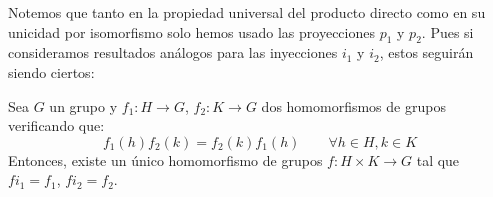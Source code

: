 \noindent
Notemos que tanto en la propiedad universal del producto directo como en su unicidad por isomorfismo solo hemos usado las proyecciones $p_1$ y $p_2$. Pues si consideramos resultados análogos para las inyecciones $i_1$ y $i_2$, estos seguirán siendo ciertos:

\begin{teo}
    Sea $G$ un grupo y $f_1:H\to G$, $f_2:K\to G$ dos homomorfismos de grupos verificando que:
    \begin{equation*}
        f_1(h)f_2(k) = f_2(k)f_1(h) \qquad \forall h\in H, k\in K
    \end{equation*}
    Entonces, existe un único homomorfismo de grupos $f:H\times K\to G$ tal que $fi_1 = f_1$, $fi_2 = f_2$.

    \begin{figure}[H]
        \centering
    \end{figure}


\end{teo}
